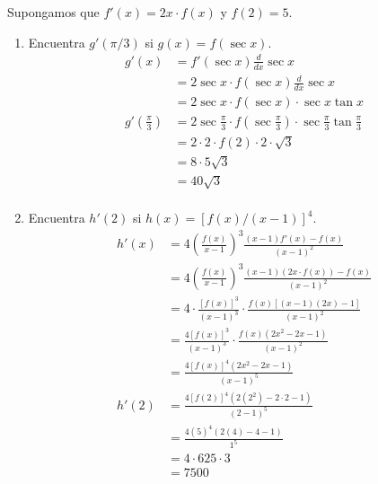 \documentclass[12pt]{article}
\begin{document}
Supongamos que $f'(x) = 2x \cdot f(x)$ y $f(2) = 5$.
\begin{enumerate}[label=(\alph*)]
\item Encuentra $g'(\pi / 3)$ si $g(x)=f(\sec x)$.
  \begin{equation*}
    \begin{split}
      g'(x)
      &= f'(\sec x)\frac{d}{dx}\sec x\\
      &= 2\sec x\cdot f(\sec x)\frac{d}{dx}\sec x\\
      &= 2\sec x\cdot f(\sec x)\cdot \sec x\tan x\\
      g'(\frac{\pi}{3})
      &= 2\sec \frac{\pi}{3}\cdot f(\sec \frac{\pi}{3})\cdot \sec \frac{\pi}{3}\tan \frac{\pi}{3}\\
      &= 2\cdot 2 \cdot f(2)\cdot 2\cdot \sqrt{3}\\
      &= 8\cdot 5 \sqrt{3}\\
      &= 40\sqrt{3}\\
    \end{split}
  \end{equation*}
  
\item Encuentra $h'(2)$ si $h(x)=\left[ f(x)/(x-1) \right]^4$.
  \begin{equation*}
    \begin{split}
      h'(x)
      &= 4\left(\frac{f(x)}{x-1}\right)^3\frac{(x-1)f'(x)-f(x)}{(x-1)^2}\\
      &= 4\left(\frac{f(x)}{x-1}\right)^3\frac{(x-1)(2x\cdot f(x))-f(x)}{(x-1)^2}\\
      &= 4\cdot \frac{[f(x)]^3}{(x-1)^3}\cdot \frac{f(x)[(x-1)(2x)-1]}{(x-1)^2}\\
      &= \frac{4[f(x)]^3}{(x-1)^3}\cdot \frac{f(x)(2x^2-2x-1)}{(x-1)^2}\\
      &= \frac{4[f(x)]^4(2x^2-2x-1)}{(x-1)^5}\\
      h'(2)
      &= \frac{4[f(2)]^4(2(2^2)-2\cdot 2-1)}{(2-1)^5}\\
      &= \frac{4(5)^4(2(4)-4-1)}{1^5}\\
      &= 4\cdot 625\cdot 3\\
      &= 7500
    \end{split}
  \end{equation*}
\end{enumerate}

\end{document}
